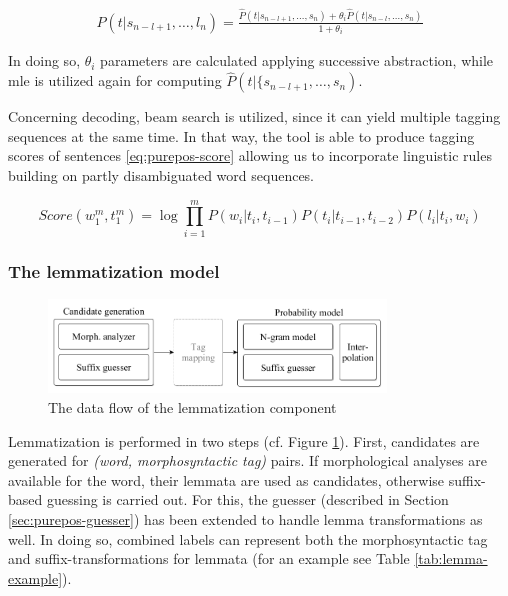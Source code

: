 \begin{align}
 P(t|s_{n-l+1}, \dots, l_n) 
 = \frac{ \hat{P}(t|s_{n-l+1}, \dots, s_n) + \theta_i \hat{P}(t|s_{n-l}, \dots, s_n)}{1+\theta_i}
\end{align}

In doing so, $\theta_i$ parameters are calculated applying successive abstraction, while \gls{mle} is utilized  again for computing $\hat{P}(t|\{s_{n-l+1}, \dots, s_n)$. 

Concerning decoding, beam search is utilized, since it can yield multiple tagging sequences at the same time. 
In that way, the tool is able to produce tagging scores of sentences \eqref{eq:purepos-score} allowing us to incorporate linguistic rules building on partly disambiguated word sequences. 

\begin{equation}\label{eq:purepos-score} %
Score(w_1^m,t_1^m) = \log \prod_{i=1}^m P(w_i|t_i,t_{i-1})P(t_i|t_{i-1},t_{i-2})P(l_i|t_i,w_i)
\end{equation}

\subsubsection{The lemmatization model}

\begin{figure}[ht]
  \centering
  \includegraphics[width=0.8\textwidth]{MorphTagging/lemma_arch.png} %
  \caption{The data flow of the lemmatization component}
  \label{fig:lemma-arch}
\end{figure}

Lemmatization is performed in two steps (cf. Figure \ref{fig:lemma-arch}). 
First, candidates are generated for \emph{(word, morphosyntactic tag)} pairs. 
If morphological analyses are available for the word, their lemmata are used as candidates, otherwise suffix-based guessing is carried out. 
For this, the guesser (described in Section \ref{sec:purepos-guesser}) has been extended to handle lemma transformations as well. 
In doing so, combined labels can represent both the morphosyntactic tag and suffix-transformations for lemmata (for an example see Table \ref{tab:lemma-example}).



